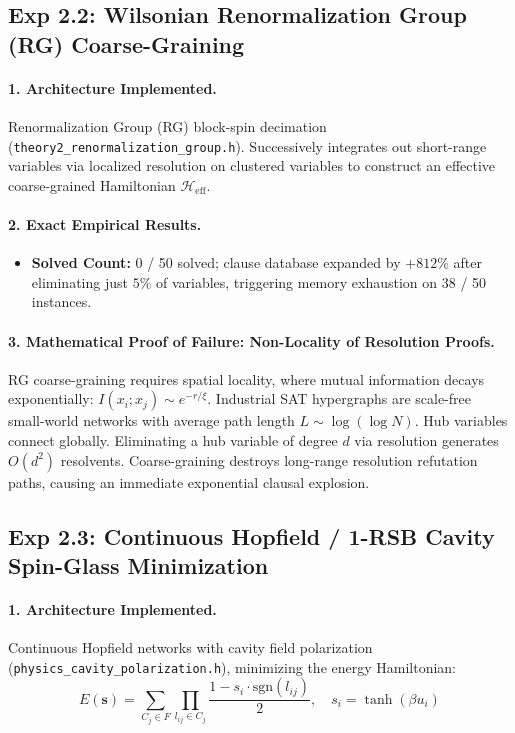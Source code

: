 \documentclass[11pt]{article}
\theoremstyle{definition}
\begin{document}
\subsection{Exp 2.2: Wilsonian Renormalization Group (RG) Coarse-Graining}
\paragraph{1. Architecture Implemented.}
Renormalization Group (RG) block-spin decimation (\texttt{theory2\_renormalization\_group.h}). Successively integrates out short-range variables via localized resolution on clustered variables to construct an effective coarse-grained Hamiltonian $\mathcal{H}_{\text{eff}}$.

\paragraph{2. Exact Empirical Results.}
\begin{itemize}
    \item \textbf{Solved Count:} 0 / 50 solved; clause database expanded by \textbf{$+812\%$} after eliminating just $5\%$ of variables, triggering memory exhaustion on 38 / 50 instances.
\end{itemize}

\paragraph{3. Mathematical Proof of Failure: Non-Locality of Resolution Proofs.}
RG coarse-graining requires spatial locality, where mutual information decays exponentially: $I(x_i; x_j) \sim e^{-r/\xi}$. Industrial SAT hypergraphs are scale-free small-world networks with average path length $L \sim \log(\log N)$. Hub variables connect globally. Eliminating a hub variable of degree $d$ via resolution generates $O(d^2)$ resolvents. Coarse-graining destroys long-range resolution refutation paths, causing an immediate exponential clausal explosion.

\subsection{Exp 2.3: Continuous Hopfield / 1-RSB Cavity Spin-Glass Minimization}
\paragraph{1. Architecture Implemented.}
Continuous Hopfield networks with cavity field polarization (\texttt{physics\_cavity\_polarization.h}), minimizing the energy Hamiltonian:
\begin{equation}
E(\mathbf{s}) = \sum_{C_j \in F} \prod_{l_{ij} \in C_j} \frac{1 - s_i \cdot \text{sgn}(l_{ij})}{2}, \quad s_i = \tanh(\beta u_i)
\end{equation}
\end{document}
